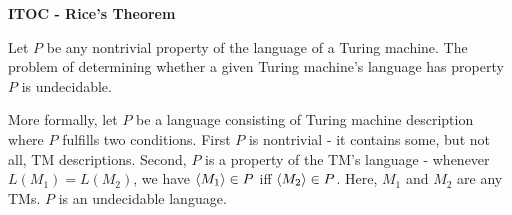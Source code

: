 \begin{shaded}
\textbf{ITOC - Rice's Theorem}

\medskip
Let $P$ be any nontrivial property of the language of a Turing machine. The problem of determining whether a given Turing machine's language has property $P$ is undecidable.

More formally, let $P$ be a language consisting of Turing machine description where $P$ fulfills two conditions. First $P$ is nontrivial - it contains some, but not all, TM descriptions. Second, $P$ is a property of the TM's language - whenever $L(M_1) = L(M_2)$, we have $\langle{M_1}\rangle \in P$ iff $\langle{M_2}\rangle \in P$. Here, $M_1$ and $M_2$ are any TMs. $P$ is an undecidable language.
\end{shaded}